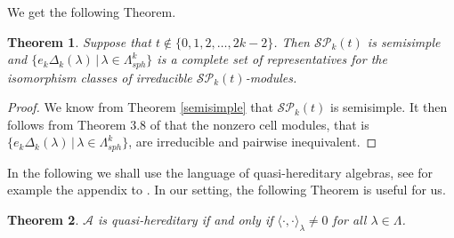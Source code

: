 \documentclass[10pt,hidelinks]{article}
\newcommand{\SpheAlg}{{\mathcal{SP} }_{k}}
\newtheorem{theorem}{Theorem}
\numberwithin{equation}{section}
\begin{document}
\medskip
We get the following Theorem. 

\begin{theorem}\label{classiirre}
  Suppose that $ t\notin \{0,1,2, \ldots, 2k-2 \} $. Then $ \SpheAlg(t) $ is semisimple and
  $ \{ e_k \Delta_k(\lambda) \, | \,  \lambda \in \Lambda_{sph}^{k} \} $ is a complete set of representatives for the isomorphism classes 
  of irreducible $ \SpheAlg(t) $-modules. 
\end{theorem}  
\begin{proof}
  We know from Theorem \ref{semisimple} that $ \SpheAlg(t) $ is semisimple. It then follows from Theorem 3.8 of \cite{GL}
  that the nonzero cell modules, that is $ \{ e_k \Delta_k(\lambda) \, | \,  \lambda \in \Lambda_{sph}^{k} \} $,
  are irreducible and pairwise inequivalent.
\end{proof}







In the following we shall use the language of quasi-hereditary algebras, 
see for example the appendix to \cite{Donkin}.
In our setting, the following Theorem is useful for us.
\begin{theorem}\label{GLqh}
  $ \mathcal A $ is quasi-hereditary if and only if $ \langle \cdot , \cdot \rangle_{\lambda} \neq 0 $
  for all $ \lambda \in \Lambda$.
\end{theorem}
\end{document}
